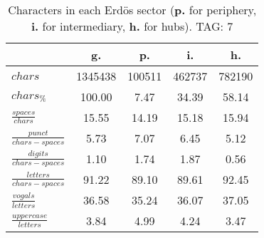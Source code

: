 \begin{table}[h!]
\begin{center}
\begin{tabular}{| l || c | c | c | c |}\hline
 & {\bf g.} & {\bf p.} & {\bf i.} & {\bf h.} \\\hline\hline
$chars$ & 1345438  & 100511  & 462737  & 782190 \\
$chars_{\%}$ & 100.00  & 7.47  & 34.39  & 58.14 \\\hline
$\frac{spaces}{chars}$ & 15.55  & 14.19  & 15.18  & 15.94 \\
$\frac{punct}{chars-spaces}$ & 5.73  & 7.07  & 6.45  & 5.12 \\
$\frac{digits}{chars-spaces}$ & 1.10  & 1.74  & 1.87  & 0.56 \\\hline
$\frac{letters}{chars-spaces}$ & 91.22  & 89.10  & 89.61  & 92.45 \\
$\frac{vogals}{letters}$ & 36.58  & 35.24  & 36.07  & 37.05 \\
$\frac{uppercase}{letters}$ & 3.84  & 4.99  & 4.24  & 3.47 \\\hline
\end{tabular}
\caption{Characters in each Erd\"os sector ({{\bf p.}} for periphery, {{\bf i.}} for intermediary, 
    {{\bf h.}} for hubs). TAG: 7}
\end{center}
\end{table}